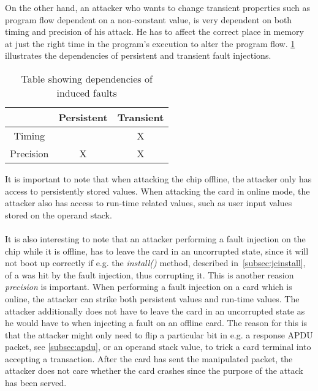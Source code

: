 On the other hand, an attacker who wants to change transient properties such as program flow dependent on a non-constant value, is very dependent on both timing and precision of his attack. He has to affect the correct place in memory at just the right time in the program's execution to alter the program flow. \cref{tab:dependencies} illustrates the dependencies of persistent and transient fault injections.

\begin{table}[h!]
\centering
\begin{tabular}{|c|c|c|}
\hline  & Persistent & Transient \\ 
\hline Timing &  & X \\ 
\hline Precision & X & X \\ 
\hline 
\end{tabular} 
\caption{Table showing dependencies of induced faults}
\label{tab:dependencies}
\end{table}

It is important to note that when attacking the chip offline, the attacker only has access to persistently stored values. When attacking the card in online mode, the attacker also has access to run-time related values, such as user input values stored on the operand stack.\\\\
It is also interesting to note that an attacker performing a fault injection on the chip while it is offline, has to leave the card in an uncorrupted state, since it will not boot up correctly if e.g. the \textit{install()} method, described in~\cref{subsec:jcinstall}, of a \jc was hit by the fault injection, thus corrupting it. This is another reasion \textit{precision} is important. When performing a fault injection on a card which is online, the attacker can strike both persistent values and run-time values. The attacker additionally does not have to leave the card in an uncorrupted state as he would have to when injecting a fault on an offline card. The reason for this is that the attacker might only need to flip a particular bit in e.g. a response APDU packet, see \cref{subsec:apdu}, or an operand stack value, to trick a card terminal into accepting a transaction. After the card has sent the manipulated packet, the attacker does not care whether the card crashes since the purpose of the attack has been served.